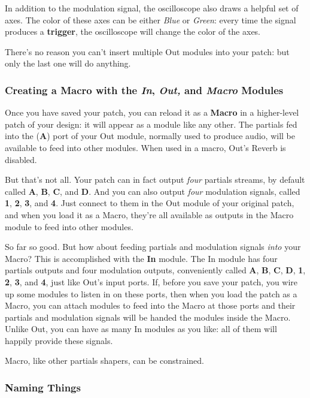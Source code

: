 \documentclass{article}
\begin{document}
In addition to the modulation signal, the oscilloscope also draws a helpful set of axes.  The color of these axes can be either {\it Blue} or {\it Green}: every time the signal produces a {\bf trigger}, the oscilloscope will change the color of the axes.

There's no reason you can't insert multiple Out modules into your patch: but only the last one will do anything.

\subsubsection{Creating a Macro with the \textit{In}, \textit{Out,} and \textit{Macro} Modules}
\label{creatingmacros}

Once you have saved your patch, you can reload it as a {\bf Macro} in a higher-level patch of your design: it will appear as a module like any other.  The partials fed into the ({\bf A}) port of your Out module, normally used to produce audio, will be available to feed into other modules. When used in a macro, Out's Reverb is disabled.

But that's not all.  Your patch can in fact output {\it four} partials streams, by default called {\bf A}, {\bf B}, {\bf C}, and {\bf D}.  And you can also output {\it four} modulation signals, called {\bf 1}, {\bf 2}, {\bf 3}, and {\bf 4}.  Just connect to them in the Out module of your original patch, and when you load it as a Macro, they're all available as outputs in the Macro module to feed into other modules. 

So far so good.  But how about feeding partials and modulation signals {\it into} your Macro?  This is accomplished with the {\bf In} module.  The In module has four partials outputs and four modulation outputs, conveniently called {\bf A}, {\bf B}, {\bf C}, {\bf D}, {\bf 1}, {\bf 2}, {\bf 3}, and {\bf 4}, just like Out's input ports.  If, before you save your patch, you wire up some modules to listen in on these ports, then when you load the patch as a Macro, you can attach modules to feed into the Macro at those ports and their partials and modulation signals will be handed the modules inside the Macro.  Unlike Out, you can have as many In modules as you like: all of them will happily provide these signals.

Macro, like other partials shapers, can be constrained.

\subsubsection{Naming Things}
\end{document}
